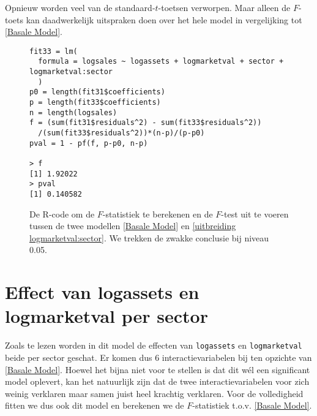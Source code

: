 \documentclass[a4paper]{report}
\begin{document}
  Opnieuw worden veel van de standaard-$t$-toetsen verworpen. Maar alleen de $F$-toets kan daadwerkelijk uitspraken doen over het hele model in vergelijking tot \ref{Basale Model}.
  
  \begin{figure}
  \begin{verbatim}
fit33 = lm(
  formula = logsales ~ logassets + logmarketval + sector + logmarketval:sector
  ) 
p0 = length(fit31$coefficients)
p = length(fit33$coefficients)
n = length(logsales)
f = (sum(fit31$residuals^2) - sum(fit33$residuals^2))
  /(sum(fit33$residuals^2))*(n-p)/(p-p0)
pval = 1 - pf(f, p-p0, n-p)

> f 
[1] 1.92022
> pval
[1] 0.140582
  \end{verbatim}
  \caption{De R-code om de $F$-statistiek te berekenen en de $F$-test uit te voeren tussen de twee modellen \ref{Basale Model} en \ref{uitbreiding logmarketval:sector}. We trekken de zwakke conclusie bij niveau 0.05.}
  \end{figure}
  
\section{Effect van logassets en logmarketval per sector}
\label{alle interacties}
  Zoals te lezen worden in dit model de effecten van \verb!logassets! en \verb!logmarketval! beide per sector geschat. Er komen dus 6 interactievariabelen bij ten opzichte van \ref{Basale Model}. Hoewel het bijna niet voor te stellen is dat dit w\' el een significant model oplevert, kan het natuurlijk zijn dat de twee interactievariabelen voor zich weinig verklaren maar samen juist heel krachtig verklaren. Voor de volledigheid fitten we dus ook dit model en berekenen we de $F$-statistiek t.o.v. \ref{Basale Model}.
  
\end{document}
